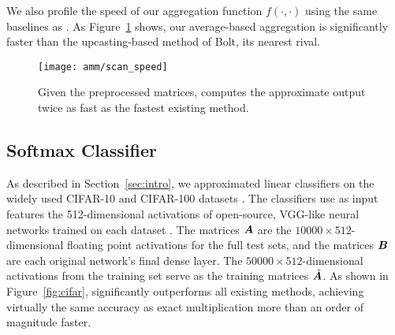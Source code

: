\vspace{-1.5mm}
We also profile the speed of our aggregation function $f(\cdot, \cdot)$ using the same baselines as \citet{bolt}. As Figure~\ref{fig:scanSpeed} shows, our average-based aggregation is significantly faster than the upcasting-based method of Bolt, its nearest rival.

\begin{figure}[h]
\begin{center}
\texttt{[image: amm/scan\_speed]}
\caption{Given the preprocessed matrices, \oursp computes the approximate output twice as fast as the fastest existing method.}
\label{fig:scanSpeed}
\end{center}
\end{figure}

\vspace{-1.5mm}
\subsection{Softmax Classifier}
\vspace{-.5mm}

As described in Section~\ref{sec:intro}, we approximated linear classifiers on the widely used CIFAR-10 and CIFAR-100 datasets \cite{cifarDsets}. The classifiers use as input features the 512-dimensional activations of open-source, VGG-like neural networks trained on each dataset \cite{cifarVgg}. The matrices $\bm{A}$ are the $10000 \times 512$-dimensional floating point activations for the full test sets, and the matrices $\bm{B}$ are each original network's final dense layer. The $50000 \times 512$-dimensional activations from the training set serve as the training matrices $\tilde{\bm{A}}$.
As shown in Figure~\ref{fig:cifar}, \oursp significantly outperforms all existing methods, achieving virtually the same accuracy as exact multiplication more than an order of magnitude faster.

